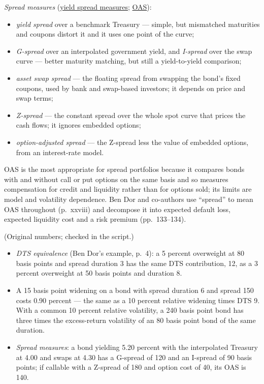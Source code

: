 \begin{qfmethod}
\emph{Spread measures} (\hyperref[def:bond-yield-spread-measures]{yield spread measures}; \hyperref[meth:option-adjusted-spread]{OAS}):
\begin{itemize}
\item \emph{yield spread} over a benchmark Treasury --- simple, but mismatched maturities and coupons distort it and it uses one point of the curve;
\item \emph{G-spread} over an interpolated government yield, and \emph{I-spread} over the swap curve --- better maturity matching, but still a yield-to-yield comparison;
\item \emph{asset swap spread} --- the floating spread from swapping the bond's fixed coupons, used by bank and swap-based investors; it depends on price and swap terms;
\item \emph{Z-spread} --- the constant spread over the whole spot curve that prices the cash flows; it ignores embedded options;
\item \emph{option-adjusted spread} --- the Z-spread less the value of embedded options, from an interest-rate model.
\end{itemize}
OAS is the most appropriate for spread portfolios because it compares bonds with and without call or put options on the same basis and so measures compensation for credit and liquidity rather than for options sold; its limits are model and volatility dependence. Ben Dor and co-authors use ``spread'' to mean OAS throughout (p.~xxviii) and decompose it into expected default loss, expected liquidity cost and a risk premium (pp.~133--134).

 (Original numbers; checked in the script.)
\begin{itemize}
\item \emph{DTS equivalence} (Ben Dor's example, p.~4): a 5 percent overweight at 80 basis points and spread duration 3 has the same DTS contribution, 12, as a 3 percent overweight at 50 basis points and duration 8.
\item A 15 basis point widening on a bond with spread duration 6 and spread 150 costs 0.90 percent --- the same as a 10 percent relative widening times DTS 9. With a common 10 percent relative volatility, a 240 basis point bond has three times the excess-return volatility of an 80 basis point bond of the same duration.
\item \emph{Spread measures}: a bond yielding 5.20 percent with the interpolated Treasury at 4.00 and swaps at 4.30 has a G-spread of 120 and an I-spread of 90 basis points; if callable with a Z-spread of 180 and option cost of 40, its OAS is 140.
\end{itemize}


\end{qfmethod}
